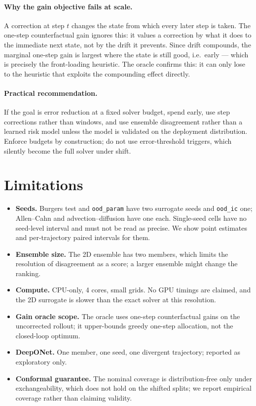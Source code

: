 \documentclass[11pt]{article}
\begin{document}
\paragraph{Why the gain objective fails at scale.} A correction at step $t$
changes the state from which every later step is taken. The one-step
counterfactual gain ignores this: it values a correction by what it does to the
immediate next state, not by the drift it prevents. Since drift compounds, the
marginal one-step gain is largest where the state is still good, i.e.\ early ---
which is precisely the front-loading heuristic. The oracle confirms this: it can
only lose to the heuristic that exploits the compounding effect directly.

\paragraph{Practical recommendation.} If the goal is error reduction at a fixed
solver budget, spend early, use step corrections rather than windows, and use
ensemble disagreement rather than a learned risk model unless the model is
validated on the deployment distribution. Enforce budgets by construction; do
not use error-threshold triggers, which silently become the full solver under
shift.

\section{Limitations}

\begin{itemize}
\item \textbf{Seeds.} Burgers test and \texttt{ood\_param} have two surrogate
  seeds and \texttt{ood\_ic} one; Allen--Cahn and advection--diffusion have one
  each. Single-seed cells have no seed-level interval and must not be read as
  precise. We show point estimates and per-trajectory paired intervals for them.
\item \textbf{Ensemble size.} The 2D ensemble has two members, which limits the
  resolution of disagreement as a score; a larger ensemble might change the
  ranking.
\item \textbf{Compute.} CPU-only, 4 cores, small grids. No GPU timings are
  claimed, and the 2D surrogate is slower than the exact solver at this
  resolution.
\item \textbf{Gain oracle scope.} The oracle uses one-step counterfactual gains
  on the uncorrected rollout; it upper-bounds greedy one-step allocation, not
  the closed-loop optimum.
\item \textbf{DeepONet.} One member, one seed, one divergent trajectory; reported
  as exploratory only.
\item \textbf{Conformal guarantee.} The nominal coverage is distribution-free
  only under exchangeability, which does not hold on the shifted splits; we
  report empirical coverage rather than claiming validity.
\end{itemize}
\end{document}
